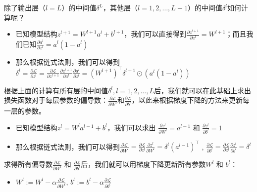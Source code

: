 \documentclass[letterpaper,10pt,english]{sphinxmanual}
\begin{document}
\sphinxAtStartPar
除了输出层（\(l=L\)）的中间值\({\delta}^{L}\)，其他层（\(l=1, 2, \ldots , L-1\)）的中间值\({\delta}^{l}\)如何计算呢？
\begin{itemize}
\item {} 
\sphinxAtStartPar
已知模型结构\({z}^{l+1}={W}^{l+1}{a}^{l}+{b}^{l+1}\)，我们可以直接得到\(\frac{\partial {z}^{l+1}}{\partial {a}^{l}}={W}^{l+1}\)；而且我们已知\(\frac{\partial {a}^l}{\partial {z}^l}={a}^l(1-{a}^l)\)

\item {} 
\sphinxAtStartPar
那么根据链式法则，我们可以得到
\({\delta}^{l} =\frac{\partial \mathcal{L}}{\partial {z}^{l}} =\frac{\partial \mathcal{L}}{\partial {z}^{l+1}}\frac{\partial {z}^{l+1}}{\partial {a}^{l}}\frac{\partial {a}^{l}}{\partial {z}^{l}} =({W}^{l+1})^\top{\delta}^{l+1}\odot({a}^l(1-{a}^l))\)

\end{itemize}

\sphinxAtStartPar
根据上面的计算有所有层的中间值\({\delta}^l, l=1, 2, \ldots , L\)后，我们就可以在此基础上求出损失函数对于每层参数的偏导数：\(\frac{\partial \mathcal{L}}{\partial {W}^l}\)和\(\frac{\partial \mathcal{L}}{\partial {b}^l}\)，以此来根据梯度下降的方法来更新每一层的参数。
\begin{itemize}
\item {} 
\sphinxAtStartPar
已知模型结构\({z}^l={W}^l{a}^{l-1}+{b}^l\)，我们可以求出
\(\frac{\partial {z}^{l}}{\partial {W}^l}={a}^{l-1}\) 和
\(\frac{\partial {z}^{l}}{\partial {b}^l}=1\)

\item {} 
\sphinxAtStartPar
那么根据链式法则，我们可以得到\(\frac{\partial \mathcal{L}}{\partial {W}^l}=\frac{\partial \mathcal{L}}{\partial {z}^l}\frac{\partial {z}^l}{\partial {W}^l}={\delta}^l({a}^{l-1})^\top\)
,
\(\frac{\partial \mathcal{L}}{\partial {b}^l}=\frac{\partial \mathcal{L}}{\partial {z}^l}\frac{\partial {z}^l}{\partial {b}^l}={\delta}^l\)

\end{itemize}

\sphinxAtStartPar
求得所有偏导数\(\frac{\partial \mathcal{L}}{\partial {W}^l}\) 和
\(\frac{\partial \mathcal{L}}{\partial {b}^l}\)后，我们就可以用梯度下降更新所有参数\({W}^l\)
和 \({b}^l\)：
\begin{itemize}
\item {} 
\sphinxAtStartPar
\({W}^l:={W}^l-\alpha\frac{\partial \mathcal{L}}{\partial {W}^l}\),
\({b}^l:={b}^l-\alpha\frac{\partial \mathcal{L}}{\partial {b}^l}\)

\end{itemize}
\end{document}
